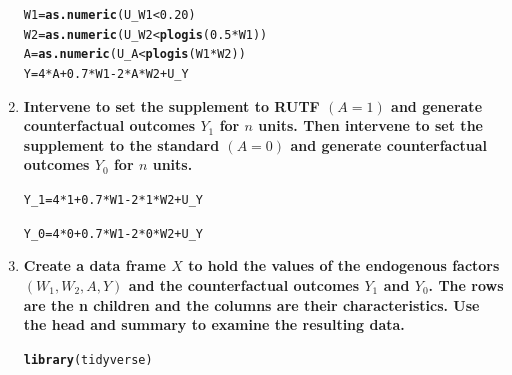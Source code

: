 \documentclass{article}\usepackage[]{graphicx}\usepackage[]{xcolor}
\makeatletter
\newcommand{\hlnum}[1]{\textcolor[rgb]{0.686,0.059,0.569}{#1}}%
\newcommand{\hlopt}[1]{\textcolor[rgb]{0,0,0}{#1}}%
\newcommand{\hlstd}[1]{\textcolor[rgb]{0.345,0.345,0.345}{#1}}%
\newcommand{\hlkwb}[1]{\textcolor[rgb]{0.69,0.353,0.396}{#1}}%
\newcommand{\hlkwd}[1]{\textcolor[rgb]{0.737,0.353,0.396}{\textbf{#1}}}%
\newenvironment{kframe}{%
 \def\at@end@of@kframe{}%
 \ifinner\ifhmode%
  \def\at@end@of@kframe{\end{minipage}}%
  \begin{minipage}{\columnwidth}%
 \fi\fi%
 \def\FrameCommand##1{\hskip\@totalleftmargin \hskip-\fboxsep
 \colorbox{shadecolor}{##1}\hskip-\fboxsep
     \hskip-\linewidth \hskip-\@totalleftmargin \hskip\columnwidth}%
 \MakeFramed {\advance\hsize-\width
   \@totalleftmargin\z@ \linewidth\hsize
   \@setminipage}}%
 {\par\unskip\endMakeFramed%
 \at@end@of@kframe}
\newenvironment{knitrout}{}{} %
\makeatother
\begin{document}
\begin{enumerate}[label=\textbf{\arabic*.}]
\begin{knitrout}
\color{fgcolor}\begin{kframe}
\begin{alltt}
\hlstd{W1} \hlkwb{=} \hlkwd{as.numeric}\hlstd{(U_W1} \hlopt{<} \hlnum{0.20}\hlstd{)}
\hlstd{W2} \hlkwb{=} \hlkwd{as.numeric}\hlstd{(U_W2} \hlopt{<} \hlkwd{plogis}\hlstd{(}\hlnum{0.5}\hlopt{*}\hlstd{W1))}
\hlstd{A} \hlkwb{=} \hlkwd{as.numeric}\hlstd{(U_A} \hlopt{<} \hlkwd{plogis}\hlstd{(W1}\hlopt{*}\hlstd{W2))}
\hlstd{Y} \hlkwb{=} \hlnum{4}\hlopt{*}\hlstd{A} \hlopt{+} \hlnum{0.7}\hlopt{*}\hlstd{W1} \hlopt{-} \hlnum{2}\hlopt{*}\hlstd{A}\hlopt{*}\hlstd{W2} \hlopt{+} \hlstd{U_Y}
\end{alltt}
\end{kframe}
\end{knitrout}
      
      \item \textbf{Intervene to set the supplement to RUTF $(A = 1)$ and generate counterfactual outcomes $Y_1$ for $n$ units. Then intervene to set the supplement to the standard $(A = 0)$ and generate counterfactual outcomes $Y_0$ for $n$ units.}
      
\begin{knitrout}
\color{fgcolor}\begin{kframe}
\begin{alltt}
\hlstd{Y_1} \hlkwb{=} \hlnum{4}\hlopt{*}\hlnum{1} \hlopt{+} \hlnum{0.7}\hlopt{*}\hlstd{W1} \hlopt{-} \hlnum{2}\hlopt{*}\hlnum{1}\hlopt{*}\hlstd{W2} \hlopt{+} \hlstd{U_Y}

\hlstd{Y_0} \hlkwb{=} \hlnum{4}\hlopt{*}\hlnum{0} \hlopt{+} \hlnum{0.7}\hlopt{*}\hlstd{W1} \hlopt{-} \hlnum{2}\hlopt{*}\hlnum{0}\hlopt{*}\hlstd{W2} \hlopt{+} \hlstd{U_Y}
\end{alltt}
\end{kframe}
\end{knitrout}
      
      \item \textbf{Create a data frame $X$ to hold the values of the endogenous factors $(W_1, W_2, A, Y)$ and the counterfactual outcomes $Y_1$ and $Y_0$. The rows are the n children and the columns are their characteristics. Use the head and summary to examine the resulting data.}
      
\begin{knitrout}
\color{fgcolor}\begin{kframe}
\begin{alltt}
\hlkwd{library}\hlstd{(tidyverse)}


\end{alltt}
\end{kframe}
\end{knitrout}
\end{enumerate}
\end{document}
